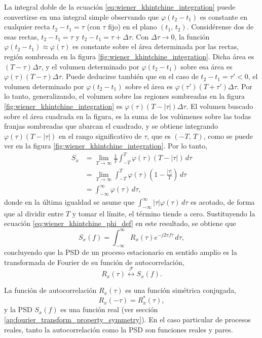 \documentclass[a4paper]{article}
\begin{document}
La integral doble de la ecuación \ref{eq:wiener_khintchine_integration} puede convertirse en una integral simple observando que \(\varphi(t_2-t_1)\) es constante en cualquier recta \(t_2-t_1=\tau\) (con \(\tau\) fijo) en el plano \((t_1,\, t_2)\). Considérense dos de esas rectas, \(t_2-t_1=\tau\) y \(t_2-t_1=\tau+\Delta\tau\). Con \(\Delta\tau\to0\), la función \(\varphi(t_2-t_1)\approx\varphi(\tau)\) es constante sobre el área determinada por las rectas, región sombreada en la figura \ref{fig:wiener_khintchine_integration}. 
Dicha área es \((T-\tau)\Delta\tau\), y el volumen determinado por \(\varphi(t_2-t_1)\) sobre esa área es \(\varphi(\tau)(T-\tau)\Delta\tau\). Puede deducirse también que en el caso de  \(t_2-t_1=\tau'<0\), el volumen determinado por \(\varphi(t_2-t_1)\) sobre el área es \(\varphi(\tau')(T+\tau')\Delta\tau\). Por lo tanto, generalizando, el volumen sobre las regiones sombreadas en la figura \ref{fig:wiener_khintchine_integration} es \(\varphi(\tau)(T-|\tau|)\Delta\tau\). El volumen buscado sobre el área cuadrada en la figura, es la suma de los volúmenes sobre las todas franjas sombreadas que abarcan el cuadrado, y se obtiene integrando  \(\varphi(\tau)(T-|\tau|)\) en el rango significativo de \(\tau\), que es  \((-T,\,T)\), como se puede ver en la figura \ref{fig:wiener_khintchine_integration}. 
Por lo tanto,
\begin{align*}
  S_x&=\lim_{T\to\infty}\frac{1}{T}\int_{-T}^{T}\varphi(\tau)(T-|\tau|)\,d\tau\\
       &=\lim_{T\to\infty}\int_{-T}^{T}\varphi(\tau)\left(1-\frac{|\tau|}{T}\right)\,d\tau\\
       &=\int_{-\infty}^{\infty}\varphi(\tau)\,d\tau,
\end{align*}
donde en la última igualdad se asume que \(\int_{-\infty}^{\infty}|\tau|\varphi(\tau)\,d\tau\) es acotado, de forma que al dividir entre \(T\) y tomar el límite, el término tiende a cero. Sustituyendo la ecuación \ref{eq:wiener_khintchine_phi_def} en este resultado, se obtiene que
\[
  S_x(f) = \int_{-\infty}^{\infty}R_x(\tau)e^{-j2\pi f\tau}\,d\tau,
\]
concluyendo que la PSD de un proceso estacionario en sentido amplio es la transformada de Fourier de su función de autocorrelación,
\[
 R_x(\tau)\overset{\mathcal{F}}{\longleftrightarrow}S_x(f).
\]

La función de autocorrelación \(R_x(\tau)\) es una función simétrica conjugada, 
\[
 R_x(-\tau) = R^*_x(\tau),
\]
y la PSD \(S_x(f)\) es una función real (ver sección \ref{ap:fourier_transform_property_symmetry}). En el caso particular de procesos reales, tanto la autocorrelación como la PSD son funciones reales y pares.
\end{document}
